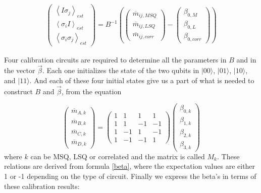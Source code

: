 \begin{equation}
\begin{split}
\begin{pmatrix} \left\langle I\sigma_j\right\rangle_{est} \\ \left\langle
\sigma_iI\right\rangle_{est} \\ \left\langle \sigma_i\sigma_j\right\rangle_{est}
\end{pmatrix}=B^{-1}\left(\begin{pmatrix} \overline{m}_{ij,MSQ} \\
\overline{m}_{ij,LSQ} \\ \overline{m}_{ij,corr}
\end{pmatrix}-\begin{pmatrix} \beta_{0,M} \\ \beta_{0,L} \\ \beta_{0,corr}
\end{pmatrix}\right)
\end{split}
\end{equation}

Four calibration circuits are required to determine all the parameters in $B$
and in the vector $\vec{\beta}$. Each one initializes the state of the two qubits in
$|00\rangle$, $|01\rangle$, $|10\rangle$, and $|11\rangle$. And each of these
four initial states give us a part of what is needed to construct $B$ and
$\vec{\beta}$, from the equation

\begin{equation}
\begin{pmatrix} \overline{m}_{A,k} \\ \overline{m}_{B,k} \\ \overline{m}_{C,k}
\\ \overline{m}_{D,k}
\end{pmatrix}=\begin{pmatrix} 1&1&1&1\\ 1&1&-1&-1\\ 1&-1&1&-1\\ 1&-1&-1&1
\end{pmatrix}\begin{pmatrix} \beta_{0,k} \\ \beta_{1,k} \\ \beta_{2,k} \\
\beta_{3,k}
\end{pmatrix}
\end{equation} where $k$ can be MSQ, LSQ or correlated and the matrix is called
$M_k$. These relations are derived from formula \ref{beta}, where the expectation
values are either 1 or -1 depending on the type of circuit. Finally we express
the beta's in terms of these calibration results:

